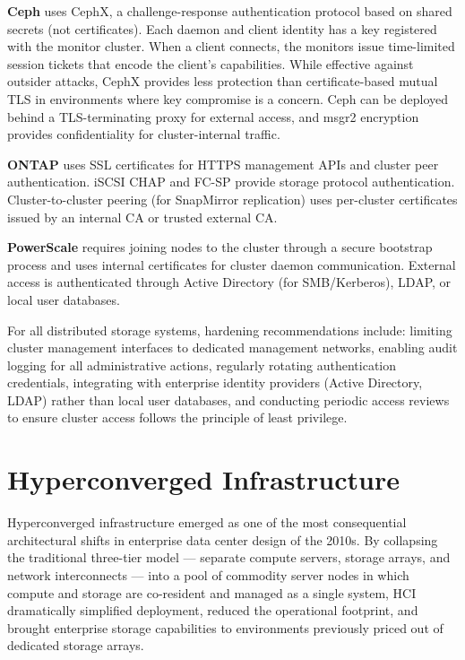 \textbf{Ceph} uses CephX, a challenge-response authentication protocol based on shared secrets (not certificates). Each daemon and client identity has a key registered with the monitor cluster. When a client connects, the monitors issue time-limited session tickets that encode the client's capabilities. While effective against outsider attacks, CephX provides less protection than certificate-based mutual TLS in environments where key compromise is a concern. Ceph can be deployed behind a TLS-terminating proxy for external access, and msgr2 encryption provides confidentiality for cluster-internal traffic.

\textbf{ONTAP} uses SSL certificates for HTTPS management APIs and cluster peer authentication. iSCSI CHAP and FC-SP provide storage protocol authentication. Cluster-to-cluster peering (for SnapMirror replication) uses per-cluster certificates issued by an internal CA or trusted external CA.

\textbf{PowerScale} requires joining nodes to the cluster through a secure bootstrap process and uses internal certificates for cluster daemon communication. External access is authenticated through Active Directory (for SMB/Kerberos), LDAP, or local user databases.

For all distributed storage systems, hardening recommendations include: limiting cluster management interfaces to dedicated management networks, enabling audit logging for all administrative actions, regularly rotating authentication credentials, integrating with enterprise identity providers (Active Directory, LDAP) rather than local user databases, and conducting periodic access reviews to ensure cluster access follows the principle of least privilege.


\section{Hyperconverged Infrastructure}

Hyperconverged infrastructure emerged as one of the most consequential architectural shifts in enterprise data center design of the 2010s. By collapsing the traditional three-tier model --- separate compute servers, storage arrays, and network interconnects --- into a pool of commodity server nodes in which compute and storage are co-resident and managed as a single system, HCI dramatically simplified deployment, reduced the operational footprint, and brought enterprise storage capabilities to environments previously priced out of dedicated storage arrays.

